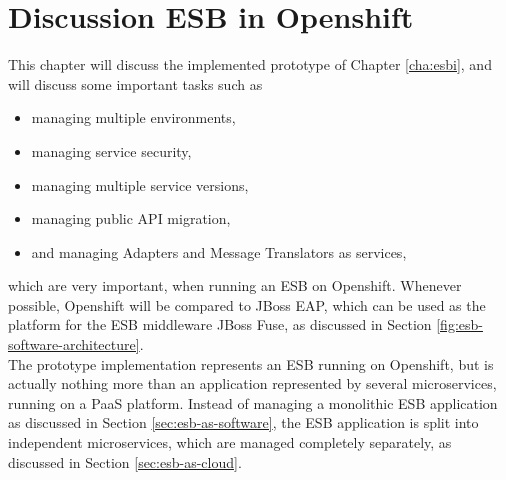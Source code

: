 \chapter{Discussion ESB in Openshift}
\label{cha:esbd}
This chapter will discuss the implemented prototype of Chapter \vref{cha:esbi}, and will discuss some important tasks such as 
\begin{itemize}
	\item managing multiple environments,
	\item managing service security,
	\item managing multiple service versions,
	\item managing public API migration,
	\item and managing Adapters and Message Translators as services,
\end{itemize}
which are very important, when running an ESB on Openshift. Whenever possible, Openshift will be compared to JBoss EAP, which can be used as the platform for the ESB middleware JBoss Fuse, as discussed in Section \vref{fig:esb-software-architecture}. \\

The prototype implementation represents an ESB running on Openshift, but is actually nothing more than an application represented by several microservices, running on a PaaS platform. Instead of managing a monolithic ESB application as discussed in Section \vref{sec:esb-as-software}, the ESB application is split into independent microservices, which are managed completely separately, as discussed in Section \vref{sec:esb-as-cloud}. \\

